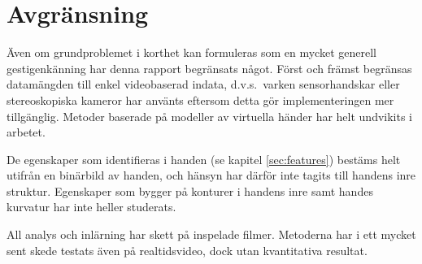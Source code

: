 \documentclass[../rapport_MVEX01-11-05]{subfiles}
\begin{document}
\section{Avgränsning}
Även om grundproblemet i korthet kan formuleras som en mycket generell
gestigenkänning har denna rapport begränsats något. Först och främst
begränsas datamängden till enkel videobaserad indata, d.v.s.~varken sensorhandskar
eller stereoskopiska kameror har använts eftersom detta gör implementeringen mer
tillgänglig. Metoder baserade på modeller av virtuella händer har helt
undvikits i arbetet.

De egenskaper som identifieras i handen (se kapitel
\ref{sec:features}) bestäms helt utifrån en binärbild av
handen, och hänsyn har därför inte tagits till handens inre
struktur. Egenskaper som bygger på konturer i handens inre samt handes
kurvatur har inte heller studerats.

All analys och inlärning har skett på inspelade filmer. Metoderna har
i ett mycket sent skede testats även på realtidsvideo, dock utan
kvantitativa resultat.
\end{document}
